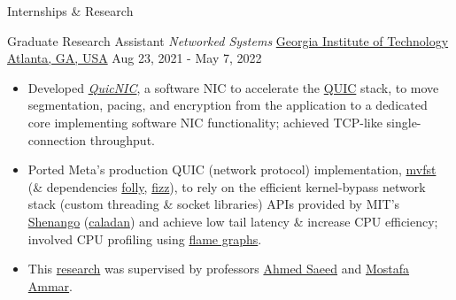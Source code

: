 \documentclass[]{mcdowellcv}
\begin{document}
  \begin{cvsection}{Internships \& Research}
    \begin{cvsubsection}
      {Graduate Research Assistant \linebreak \textit{Networked Systems}}
      {\href{https://scs.gatech.edu/}{Georgia Institute of Technology \linebreak Atlanta, GA, USA}}
      {Aug 23, 2021 - May 7, 2022}
        \begin{itemize}
          \item
            Developed
            \href{https://github.com/saubhik/caladan/pulls}{\textit{QuicNIC}},
            a software NIC to accelerate the \href{https://quicwg.org/}{QUIC}
            stack, to move segmentation, pacing, and encryption from the
            application to a dedicated core implementing software NIC
            functionality; achieved TCP-like single-connection throughput.
          \item
            Ported Meta's production QUIC (network protocol) implementation,
            \href{https://github.com/facebookincubator/mvfst}{mvfst} (\&
            dependencies \href{https://github.com/facebook/folly}{folly},
            \href{https://github.com/facebookincubator/fizz}{fizz}), to rely on
            the efficient kernel-bypass network stack (custom threading \&
            socket libraries) APIs provided by MIT's
            \href{https://www.usenix.org/conference/nsdi19/presentation/ousterhout}{Shenango}
            (\href{https://github.com/shenango/caladan}{caladan}) and achieve
            low tail latency \& increase CPU efficiency; involved CPU profiling
            using
            \href{https://www.brendangregg.com/FlameGraphs/cpuflamegraphs.html}{flame
            graphs}.
          \item
            This
            \href{https://drive.google.com/file/d/1-y7gsG67KGIeD2qhomVT0vTPlPB4Vep1/view?usp=sharing}{research}
            was supervised by professors
            \href{https://saeed.github.io/index.html}{Ahmed Saeed} and
            \href{https://www.cc.gatech.edu/fac/Mostafa.Ammar/}{Mostafa Ammar}.
        \end{itemize}
    \end{cvsubsection}


\end{cvsection}
\end{document}
